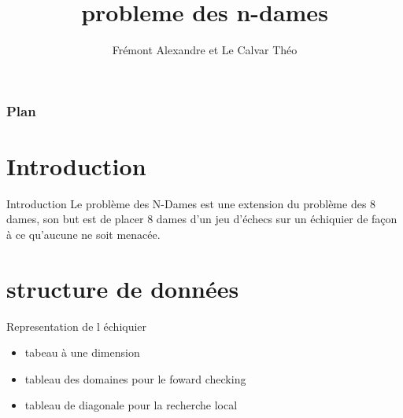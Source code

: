 \documentclass[10pt,a4paper]{beamer}
\author{Frémont Alexandre et Le Calvar Théo}
\title{probleme des n-dames}
\date{\displaydate{date}}
\begin{document}
\begin{frame}
\titlepage
\end{frame}

\begin{frame}
	\frametitle{Plan}
	\tableofcontents[pausesections]

\end{frame}

\section{Introduction}
\begin{frame}

	\begin{block}{Introduction}
	Le problème des N-Dames est une extension du problème des 8 dames, son
	but est de placer 8 dames d’un jeu d’échecs sur un échiquier de façon à ce
	qu’aucune ne soit menacée.

	\end{block}

\end{frame}

\section{structure de données}
\begin{frame}


	\begin{block}{Representation de l échiquier}
		\begin{itemize}
			\item{tabeau à une dimension}
			\item{tableau des domaines pour le foward checking}
			\item{tableau de diagonale pour la recherche local}
		\end{itemize}
	\end{block}


\end{frame}
\end{document}
